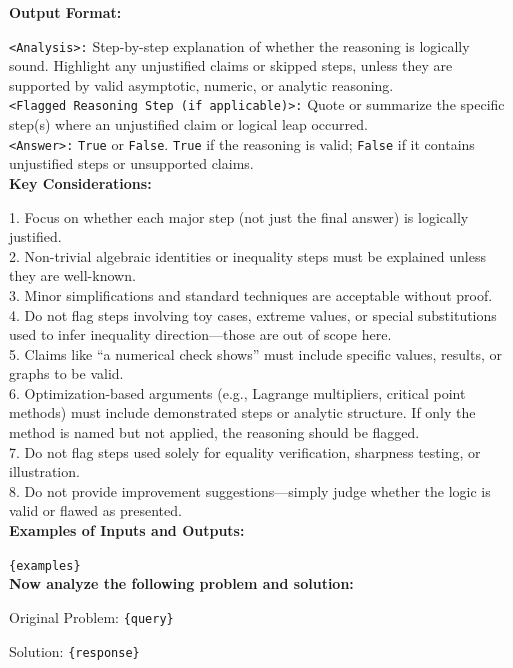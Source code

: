 \begin{textcolorbox}
\textbf{Output Format:}

\texttt{<Analysis>:} Step-by-step explanation of whether the reasoning is logically sound. Highlight any unjustified claims or skipped steps, unless they are supported by valid asymptotic, numeric, or analytic reasoning. \\
\texttt{<Flagged Reasoning Step (if applicable)>:} Quote or summarize the specific step(s) where an unjustified claim or logical leap occurred. \\
\texttt{<Answer>:} \texttt{True} or \texttt{False}. \texttt{True} if the reasoning is valid; \texttt{False} if it contains unjustified steps or unsupported claims. \\

\textbf{Key Considerations:}

1. Focus on whether each major step (not just the final answer) is logically justified.\\
2. Non-trivial algebraic identities or inequality steps must be explained unless they are well-known.\\
3. Minor simplifications and standard techniques are acceptable without proof.\\
4. Do not flag steps involving toy cases, extreme values, or special substitutions used to infer inequality direction—those are out of scope here.\\
5. Claims like ``a numerical check shows'' must include specific values, results, or graphs to be valid.\\
6. Optimization-based arguments (e.g., Lagrange multipliers, critical point methods) must include demonstrated steps or analytic structure. If only the method is named but not applied, the reasoning should be flagged.\\
7. Do not flag steps used solely for equality verification, sharpness testing, or illustration.\\
8. Do not provide improvement suggestions—simply judge whether the logic is valid or flawed as presented.\\

\textbf{Examples of Inputs and Outputs:}

\texttt{\{examples\}}\\

\textbf{Now analyze the following problem and solution:}

Original Problem:
\texttt{\{query\}}

Solution:
\texttt{\{response\}}

\end{textcolorbox}


